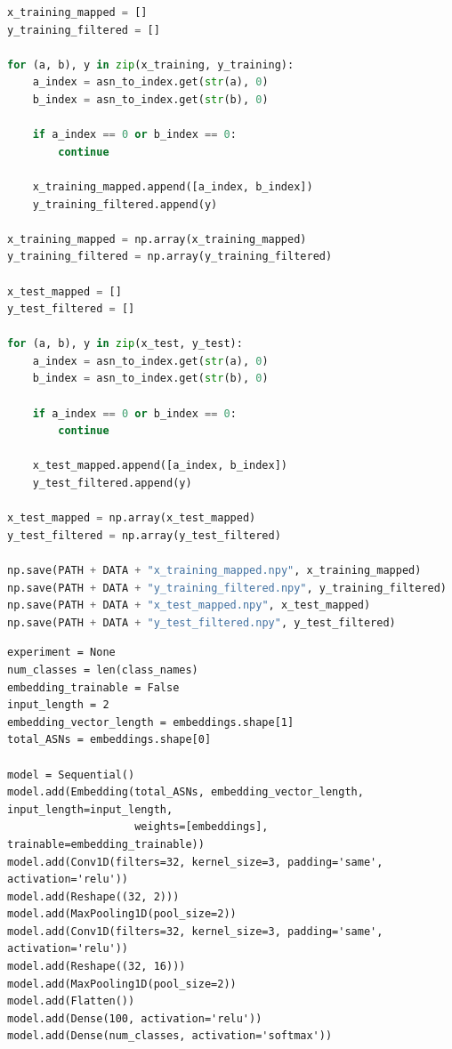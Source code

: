 \begin{lstlisting}[language=Python, basicstyle=\ttfamily\footnotesize, caption=Mapeo final de ASN a índices para la etapa supervisada, label=anxcode:mapeo_asn_id]
x_training_mapped = []
y_training_filtered = []

for (a, b), y in zip(x_training, y_training):
    a_index = asn_to_index.get(str(a), 0)
    b_index = asn_to_index.get(str(b), 0)

    if a_index == 0 or b_index == 0:
        continue

    x_training_mapped.append([a_index, b_index])
    y_training_filtered.append(y)

x_training_mapped = np.array(x_training_mapped)
y_training_filtered = np.array(y_training_filtered)

x_test_mapped = []
y_test_filtered = []

for (a, b), y in zip(x_test, y_test):
    a_index = asn_to_index.get(str(a), 0)
    b_index = asn_to_index.get(str(b), 0)

    if a_index == 0 or b_index == 0:
        continue

    x_test_mapped.append([a_index, b_index])
    y_test_filtered.append(y)

x_test_mapped = np.array(x_test_mapped)
y_test_filtered = np.array(y_test_filtered)

np.save(PATH + DATA + "x_training_mapped.npy", x_training_mapped)
np.save(PATH + DATA + "y_training_filtered.npy", y_training_filtered)
np.save(PATH + DATA + "x_test_mapped.npy", x_test_mapped)
np.save(PATH + DATA + "y_test_filtered.npy", y_test_filtered)
\end{lstlisting}

\begin{lstlisting}[basicstyle=\ttfamily, caption=Modelo CNN utilizado en el enfoque BGP2Vec, label=anxcode:cnn_bgp2vec_model]
experiment = None
num_classes = len(class_names)
embedding_trainable = False
input_length = 2
embedding_vector_length = embeddings.shape[1]
total_ASNs = embeddings.shape[0]

model = Sequential()
model.add(Embedding(total_ASNs, embedding_vector_length, input_length=input_length,
                    weights=[embeddings], trainable=embedding_trainable))
model.add(Conv1D(filters=32, kernel_size=3, padding='same', activation='relu'))
model.add(Reshape((32, 2)))
model.add(MaxPooling1D(pool_size=2))
model.add(Conv1D(filters=32, kernel_size=3, padding='same', activation='relu'))
model.add(Reshape((32, 16)))
model.add(MaxPooling1D(pool_size=2))
model.add(Flatten())
model.add(Dense(100, activation='relu'))
model.add(Dense(num_classes, activation='softmax'))
\end{lstlisting}

